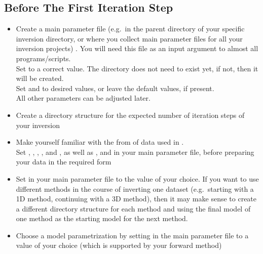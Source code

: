 \subsection*{Before The First Iteration Step}
%
\begin{itemize}
\item Create a main parameter file (e.g.\ in the parent directory of your specific inversion directory, 
or where you collect main parameter files for all your inversion projects)
. You will need this file as an input argument to almost all programs/scripts.\\
Set  to a correct value. 
The directory does not need to exist yet, if not, then it will be created. \\
Set  and 
 to desired values, 
or leave the default values, if present.\\
All other parameters can be adjusted later. 
%
\item Create a directory structure for the expected number of iteration steps of your inversion 
%
\item Make yourself familiar with the from of data used in \ASKI {}. \\
  Set , , , 
  , and , as well as , 
   and   in your main 
  parameter file, before preparing your data in the required form 
%
\item Set  in your main 
parameter file to the value of your choice. If you want to use different methods in the course of 
inverting one dataset (e.g.\ starting with a 1D method, continuing with a 3D method), then it may make 
sense to create a different directory structure for each method and using the final model of one method
as the starting model for the next method.
%
\item Choose a model parametrization by setting  in the main parameter file 
to a value of your choice (which is supported by your forward method)
%
\end{itemize}
%
